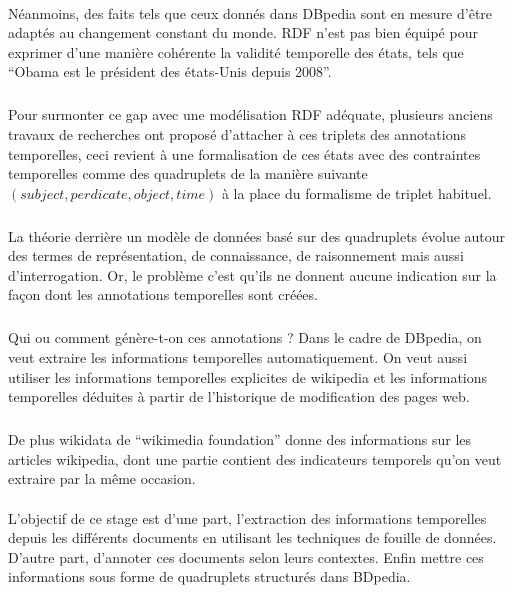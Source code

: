 \paragraph{}
Néanmoins, des faits tels que ceux donnés dans DBpedia sont en mesure d’être adaptés au changement constant du monde.
RDF n’est pas bien équipé pour exprimer d’une manière cohérente la validité temporelle des états, tels que “Obama est le président des états-Unis depuis 2008”. 
\subparagraph{}
Pour surmonter ce gap avec une modélisation RDF adéquate, plusieurs anciens travaux de recherches ont proposé d’attacher à ces triplets des annotations temporelles, ceci revient à une formalisation de ces états avec des contraintes temporelles comme des quadruplets de la manière suivante $(subject, perdicate, object, time)$ à la place du formalisme de triplet habituel.
\subparagraph{}
La théorie derrière un modèle de données basé sur des quadruplets évolue autour des termes de représentation, de connaissance, de raisonnement mais aussi d’interrogation. Or, le problème c’est qu’ils ne donnent aucune indication sur la façon dont les annotations temporelles sont créées.
\subparagraph{}
Qui ou comment génère-t-on ces annotations ?
\newline
Dans le cadre de DBpedia, on veut extraire les informations temporelles automatiquement. On veut aussi utiliser les informations temporelles explicites de wikipedia et les informations temporelles déduites à partir de l’historique de modification des pages web.
\subparagraph{}
De plus wikidata de “wikimedia foundation” donne des informations sur les articles wikipedia, dont une partie contient des indicateurs temporels qu’on veut extraire par la même occasion.
\paragraph{}
L’objectif de ce stage est d’une part, l’extraction des informations temporelles depuis les différents documents en utilisant les techniques de fouille de données. D’autre part, d’annoter ces documents selon leurs contextes. Enfin mettre ces informations sous forme de quadruplets structurés dans BDpedia.